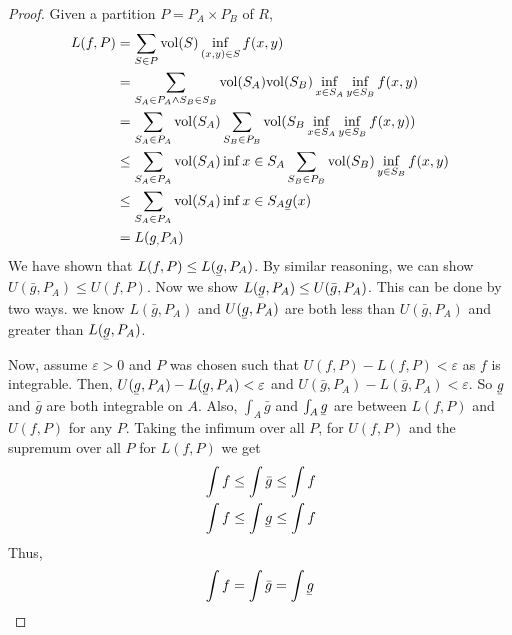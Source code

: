 \documentclass[a4paper]{article}
\newcommand{\ubar}[1]{\underaccent{\bar}{#1}}
\numberwithin{equation}{section}
\newcommand{\vol}{\mathrm{vol}}
\begin{document}
\begin{theorem}[Fubini's]
\begin{proof}
        Given a partition $P=P_A\times P_B$ of $R$,
        \begin{align}
            L(f,P)&=\sum_{S\in P}\vol(S)\inf_{(x,y)\in S}f(x,y)\\
            &=\sum_{S_A\in P_A\land S_B\in S_B} \vol(S_A)\vol(S_B)\inf_{x\in S_A} \inf_{y\in S_B} f(x,y)\\
            &=\sum_{S_A\in P_A}\vol(S_A)\sum_{S_B\in P_B}\vol(S_B\inf_{x\in S_A} \inf_{y\in S_B} f(x,y))\\
            &\leq\sum_{S_A\in P_A}\vol(S_A)\inf{x\in S_A}\sum_{S_B\in P_B}\vol(S_B)\inf_{y\in S_B} f(x,y)\\
            &\leq\sum_{S_A\in P_A}\vol(S_A)\inf{x\in S_A}\ubar{g}(x)\\
            &=L(g_,P_A)
        \end{align}
        We have shown that $L(f,P)\leq L(\ubar{g},P_A)$. By similar reasoning, we can show $U(\bar{g},P_A)\leq U(f,P)$. Now we show $L(\ubar{g},P_A)\leq U(\bar{g},P_A)$. This can be done by two ways. we know $L(\bar{g},P_A)$ and $U(\ubar{g},P_A)$ are both less than $U(\bar{g},P_A)$ and greater than $L(\ubar{g},P_A)$. 

        Now, assume $\varepsilon>0$ and $P$ was chosen such that $U(f,P)-L(f,P)<\varepsilon$ as $f$ is integrable. Then, $U(\ubar{g},P_A)-L(\ubar{g},P_A)<\varepsilon$ and $U(\bar{g},P_A)-L(\bar{g},P_A)<\varepsilon$. So $\ubar{g}$ and $\bar{g}$ are both integrable on $A$. Also, $\int_A\bar{g}$ and $\int_A\ubar{g}$ are between $L(f,P)$ and $U(f,P)$ for any $P$. Taking the infimum over all $P$, for $U(f,P)$ and the supremum over all $P$ for $L(f,P)$ we get 
        \begin{align}
            &\int f\leq \int \bar{g}\leq \int f\\
            &\int f\leq \int\ubar{g}\leq \int f
        \end{align}
        Thus, 
        \begin{equation}
            \int f=\int\bar{g}=\int\ubar{g}
        \end{equation}
    \end{proof}
\end{theorem}
\end{document}
